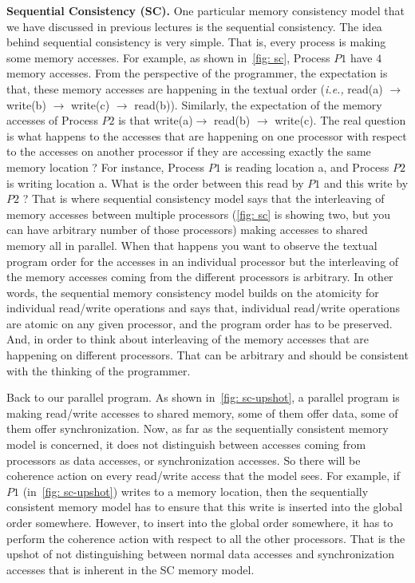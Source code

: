 \documentclass[11pt]{lecture}
\begin{document}
\noindent
{\bf Sequential Consistency (SC).} One particular memory consistency model that we have discussed 
in previous lectures is the sequential consistency. The idea behind sequential consistency is 
very simple. That is, every process is making some memory accesses. For example, as shown 
in~\autoref{fig: sc}, Process $P1$ have $4$ memory accesses. From the perspective of 
the programmer, the expectation is that, these memory accesses are happening in the textual order 
({\it i.e.,} {\code read(a)} $\rightarrow$ {\code write(b)} $\rightarrow$ {\code write(c)} $\rightarrow$ {\code read(b)}). Similarly, the expectation of the memory accesses of Process $P2$ 
is that {\code write(a)}$\rightarrow$ {\code read(b)} $\rightarrow$ {\code write(c)}. The real 
question is what happens to the accesses that are happening on one processor with respect 
to the accesses on another processor if they are accessing exactly the same memory location ? 
For instance, Process $P1$ is reading location {\code a}, and Process $P2$ is writing location 
{\code a}. What is the order between this read by $P1$ and this write by $P2$ ? That is 
where sequential consistency model says that the interleaving of memory accesses between 
multiple processors (\autoref{fig: sc} is showing two, but you can have arbitrary number of 
those processors) making accesses to shared memory all in parallel. When that happens 
you want to observe the textual program order for the accesses in an individual processor 
but the interleaving of the memory accesses coming from the different processors is 
arbitrary. In other words, the sequential memory consistency model builds on the atomicity 
for individual read/write operations and says that, individual read/write operations 
are atomic on any given processor, and the program order has to be preserved. And, in order to think 
about interleaving of the memory accesses that are happening on different processors. That can be 
arbitrary and should be consistent with the thinking of the programmer. 

Back to our parallel program. As shown in~\autoref{fig: sc-upshot}, a parallel program is making read/write 
accesses to shared memory, some of them offer data, some of them offer synchronization. Now, 
as far as the sequentially consistent memory model is concerned, it does not distinguish 
between accesses coming from processors as data accesses, or synchronization accesses. So there 
will be coherence action on every read/write access that the model sees. For example, 
if $P1$ (in~\autoref{fig: sc-upshot}) writes to a memory location, then the sequentially consistent memory model 
has to ensure that this write is inserted into the global order somewhere. However, to 
insert into the global order somewhere, it has to perform the coherence action with respect to all 
the other processors. That is the upshot of not distinguishing between normal data accesses 
and synchronization accesses that is inherent in the SC memory model. 
\end{document}
